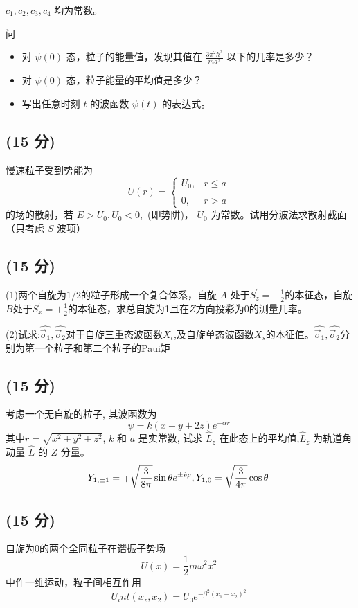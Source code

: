 \(c_1, c_2, c_3, c_4\) 均为常数。

问\begin{itemize}
  \item  对 \( \psi (0) \) 态，粒子的能量值，发现其值在 \( \frac{3\pi^2 \hbar^2}{ma^2} \) 以下的几率是多少？
  \item  对 \( \psi (0) \) 态，粒子能量的平均值是多少？
  \item  写出任意时刻 \( t \) 的波函数 \( \psi (t) \) 的表达式。
\end{itemize}
\subsection{(15 分)}
 慢速粒子受到势能为
\[U(r) = \begin{cases} U_0, & r \leq a \\\\0, & r > a \end{cases}~\]
的场的散射，若 $E > U_0, U_0 < 0,$ (即势阱)， $U_0$ 为常数。试用分波法求散射截面（只考虑 $S$ 波项）
\subsection{(15 分)}
(1)两个自旋为$1/2$的粒子形成一个复合体系，自旋 $A$ 处于$S^\prime_z =+\frac{1}{2}$的本征态，自旋$B$处于$S^\prime_x=+\frac{1}{2}$的本征态，求总自旋为1且在$Z$方向投彩为0的测量几率。

(2)试求:$\hat{\vec{\sigma}_1},\hat{\vec{\sigma}_2}$对于自旋三重态波函数$X_t$,及自旋单态波函数$X_s$的本征值。$\hat{\vec{\sigma}_1},\hat{\vec{\sigma}_2}$分别为第一个粒子和第二个粒子的Paui矩
\subsection{(15 分)}
考虑一个无自旋的粒子, 其波函数为
\[\psi = k (x + y + 2z) e^{-\alpha r}~\]
其中$r = \sqrt{x^2 + y^2 + z^2}$, $ k$ 和 $a$ 是实常数, 试求 $\hat{L}_z$ 在此态上的平均值,$\hat{L}_z$ 为轨道角动量 $\hat{L}$ 的 $Z$ 分量。
\[Y_{1, \pm 1} = \mp \sqrt{\frac{3}{8\pi}} \sin \theta e^{\pm i\varphi}, \\ Y_{1,0} = \sqrt{\frac{3}{4\pi}} \cos \theta~\]
\subsection{(15 分)}
自旋为0的两个全同粒子在谐振子势场
\[U(x)=\frac{1}{2}m\omega^2x^2~\]
中作一维运动，粒子间相互作用
\[U_int(x_z,x_2)=U_0e^{-\beta^2(x_1-x_2)^2}~\]
